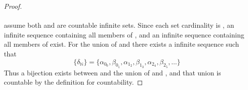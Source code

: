 \documentclass[preview]{standalone}
\begin{document}
\begin{proof}
    \\ \\
     assume both  and \bm{$\Lambda$} are countable infinite sets. 
    Since each set cardinality is , 
    an infinite sequence 
    containing all members of ,
    and an infinite sequence 
    containing all members of \bm{$\Lambda$}
    exist.
    For the union of  and \bm{$\Lambda$}
    there exists a infinite sequence \bm{$\big \{ \delta \big \} $} such that
    \begin{equation*}
        \big \{ \delta_\mathbb{N} \big \} 
            = 
        \big \{
            \alpha_{0_0}, \beta_{0_1}, 
            \alpha_{1_2}, \beta_{1_3}, 
            \alpha_{2_4}, \beta_{2_5}, 
            \dots
        \big \}    
    \end{equation*}
    Thus a bijection 
    exists between  and the union of  and \bm{$\Lambda$}, 
    and that union is countable by the definition for countability.
\color{lightgray} \end{proof}
\end{document}
